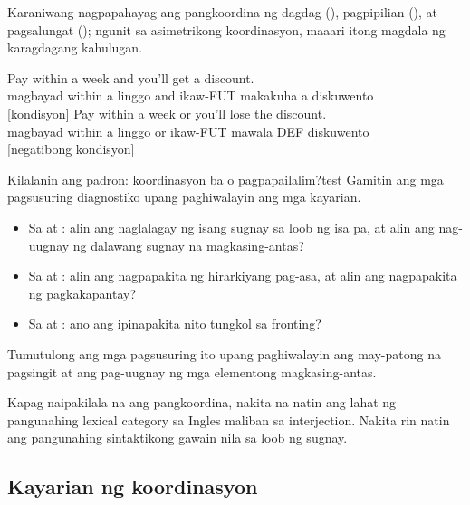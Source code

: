 Karaniwang nagpapahayag ang pangkoordina ng dagdag (), pagpipilian (), at pagsalungat (); ngunit sa asimetrikong koordinasyon, maaari itong magdala ng karagdagang kahulugan.

\ea \label{ex:coord-meaning-tl}
    \ea \gll Pay within a week and you'll get a discount.\\
        magbayad within a linggo and ikaw-FUT makakuha a diskuwento\\
    \glt {} [kondisyon]
    \ex \gll Pay within a week or you'll lose the discount.\\
        magbayad within a linggo or ikaw-FUT mawala DEF diskuwento\\
    \glt {} [negatibong kondisyon]
    \z
\z

\begin{tblsframedsymbol}{Kilalanin ang padron: koordinasyon ba o pagpapailalim?}{test}
Gamitin ang mga pagsusuring diagnostiko upang paghiwalayin ang mga kayarian.
\begin{itemize}[noitemsep, leftmargin=*]
    \item Sa  at : alin ang naglalagay ng isang sugnay sa loob ng isa pa, at alin ang nag-uugnay ng dalawang sugnay na magkasing-antas?
    \item Sa  at : alin ang nagpapakita ng hirarkiyang pag-asa, at alin ang nagpapakita ng pagkakapantay?
    \item Sa  at : ano ang ipinapakita nito tungkol sa fronting?
\end{itemize}
Tumutulong ang mga pagsusuring ito upang paghiwalayin ang may-patong na pagsingit at ang pag-uugnay ng mga elementong magkasing-antas.
\end{tblsframedsymbol}

Kapag naipakilala na ang pangkoordina, nakita na natin ang lahat ng pangunahing lexical category sa Ingles maliban sa interjection. Nakita rin natin ang pangunahing sintaktikong gawain nila sa loob ng sugnay.

\subsection{Kayarian ng koordinasyon}

